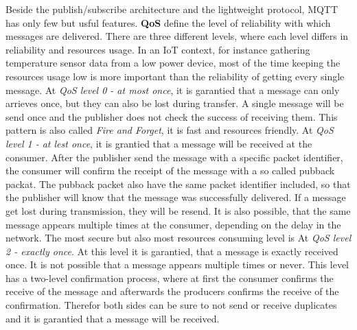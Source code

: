 Beside the publish/subscribe architecture and the lightweight protocol, \ac{MQTT} has only few but usful features.
\textbf{\ac{QoS}} define the level of reliability with which messages are delivered.\autocite[cf.]{Bayer:MQTT}
There are three different levels, where each level differs in reliability and resources usage.\autocite[cf.]{Bayer:MQTT}
In an \ac{IoT} context, for instance gathering temperature sensor data from a low power device, most of the time keeping the resources usage low is more important than the reliability of getting every single message.\newline
At \textit{\ac{QoS} level 0 - at most once}, it is garantied that a message can only arrieves once, but they can also be lost during transfer.
A single message will be send once and the publisher does not check the success of receiving them.
This pattern is also called \textit{Fire and Forget}, it is fast and resources friendly.\autocite[cf.]{Bayer:MQTT}\newline
At \textit{\ac{QoS} level 1 - at lest once}, it is grantied that a message will be received at the consumer.
After the publisher send the message with a specific packet identifier, the consumer will confirm the receipt of the message with a so called pubback packat.
The pubback packet also have the same packet identifier included, so that the publisher will know that the message was successfully delivered.
If a message get lost during transmission, they will be resend.
It is also possible, that the same message appears multiple times at the consumer, depending on the delay in the network.\newline
The most secure but also most resources consuming level is At \textit{\ac{QoS} level 2 - exactly once}.
At this level it is garantied, that a message is exactly received once.
It is not possible that a message appears multiple times or never.
This level has a two-level confirmation process, where at first the consumer confirms the receive of the message and afterwards the producers confirms the receive of the confirmation.
Therefor both sides can be sure to not send or receive duplicates and it is garantied that a message will be received.

